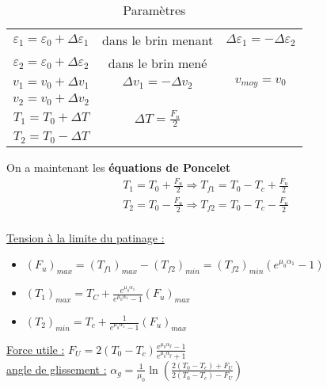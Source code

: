 \documentclass[../main.tex]{subfiles}
\begin{document}
\begin{table}[hbt!]
    \centering
    \begin{tabular}{c|c|c}
        $\varepsilon_1 = \varepsilon_0 + \Delta \varepsilon_1$ & dans le brin menant & $\Delta \varepsilon_1 = - \Delta \varepsilon_2$ \\
        $\varepsilon_2 = \varepsilon_0 + \Delta \varepsilon_2$ & dans le brin mené\\
        \hline
        $v_1 = v_0 + \Delta v_1$ & $\Delta v_1 = -\Delta v_2$& $v_{moy} = v_0$\\
        $v_2 = v_0 + \Delta v_2$ & & \\
        \hline
        $T_1 = T_0 + \Delta T$ & $\Delta T = \frac{F_u}{2}$ & \\
        $T_2 = T_0 - \Delta T$ & & \\
    \end{tabular}
    \caption{Paramètres}
\end{table}

On a maintenant les \textbf{équations de Poncelet} \begin{equation}
    \begin{gathered}
        T_1 = T_0 + \frac{F_u}{2} \Rightarrow T_{f1} = T_0 - T_c + \frac{F_u}{2}\\
        T_2 = T_0 - \frac{F_u}{2} \Rightarrow T_{f2} = T_0 - T_c - \frac{F_u}{2}\\
    \end{gathered}
\end{equation}

\quad \underline{Tension à la limite du patinage :}\\
\begin{itemize}
    \item $(F_u)_{max} = (T_{f1})_{max} - (T_{f2})_{min} = (T_{f2})_{min} (e^{\mu_0\alpha_1}-1)$\\
    \item $(T_1)_{max} = T_C + \frac{e^{\mu_0\alpha_1}}{e^{\mu_0\alpha_1}-1} (F_u)_{max}$\\
    \item $(T_2)_{min} = T_c + \frac{1}{e^{\mu_0\alpha_1}-1} (F_u)_{max}$
\end{itemize}

\underline{Force utile :} $F_U = 2(T_0-T_c) \frac{e^{\mu_0 \alpha_g}-1}{e^{\mu_0 \alpha_g}+1}$\\
\underline{angle de glissement :} $\alpha_g = \frac{1}{\mu_0} \ln(\frac{2(T_0-T_c)+F_U}{2(T_0-T_c)-F_U})$\\
\end{document}
